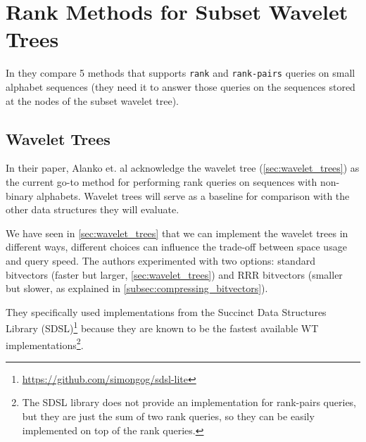 \section{Rank Methods for Subset Wavelet Trees} \label{sec:rank_succint_datastructures}
In \cite{SubsetWT} they compare 5 methods that supports \texttt{rank} and \texttt{rank-pairs} queries on small alphabet sequences (they need it to answer those queries on the sequences stored at the nodes of the subset wavelet tree).

\subsection{Wavelet Trees}

In their paper, Alanko et. al acknowledge the wavelet tree (\autoref{sec:wavelet_trees}) as the current go-to method for performing rank queries on sequences with non-binary alphabets. Wavelet trees will serve as a baseline for comparison with the other data structures they will evaluate. \vspace{0.4cm}

\noindent We have seen in \autoref{sec:wavelet_trees} that we can implement the wavelet trees in different ways, different choices can influence the trade-off between space usage and query speed. The authors experimented with two options: standard bitvectors (faster but larger, \autoref{sec:wavelet_trees}) and RRR bitvectors (smaller but slower, as explained in \autoref{subsec:compressing_bitvectors}). \vspace{0.4cm}

\noindent They specifically used implementations from the Succinct Data Structures Library (SDSL)\footnote{\url{https://github.com/simongog/sdsl-lite}} because they are known to be the fastest available WT implementations\footnote{The SDSL library does not provide an implementation for rank-pairs queries, but they are just the sum of two rank queries, so they can be easily implemented on top of the rank queries.}. \vspace{0.4cm}

 \vspace{0.4cm}


